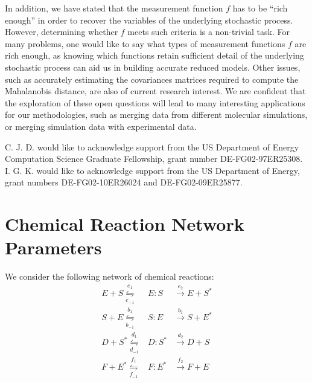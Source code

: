 \documentclass[aip,jcp,preprint]{revtex4-1}
\begin{document}
In addition, we have stated that the measurement function $f$ has to be ``rich enough'' in order to recover the variables of the underlying stochastic process.
%
However, determining whether $f$ meets such criteria is a non-trivial task.
%
For many problems, one would like to say what types of measurement functions $f$ are rich enough, as knowing which functions retain sufficient detail of the underlying stochastic process can aid us in building accurate reduced models.
%
Other issues, such as accurately estimating the covariances matrices required to compute the Mahalanobis distance, are also of current research interest.
%
We are confident that the exploration of these open questions will lead to many interesting applications for our methodologies, such as merging data from different molecular simulations, or merging simulation data with experimental data.

\begin{acknowledgments}
C. J. D. would like to acknowledge support from the US Department of Energy Computation Science Graduate Fellowship, grant number DE-FG02-97ER25308.
%
I. G. K. would like to acknowledge support from the US Department of Energy, grant numbers DE-FG02-10ER26024 and DE-FG02-09ER25877.
\end{acknowledgments}



\appendix

\section{Chemical Reaction Network Parameters} \label{app:rxn}

We consider the following network of chemical reactions:
\begin{equation}
\begin{array}{rcl}
E + S \overset{e_1}{\underset{e_{-1}}{\leftrightharpoons}} & E:S & \overset{e_2}{\rightarrow} E + S^{*} \\
S + E \overset{b_1}{\underset{b_{-1}}{\leftrightharpoons}} & S:E & \overset{b_2}{\rightarrow} S + E^{*}\\
D + S^{*} \overset{d_1}{\underset{d_{-1}}{\leftrightharpoons}} & D:S^{*} & \overset{d_2}{\rightarrow} D + S\\
F + E^{*} \overset{f_1}{\underset{f_{-1}}{\leftrightharpoons}} & F:E^{*} & \overset{f_2}{\rightarrow} F + E
\end{array}
\end{equation}
\end{document}
